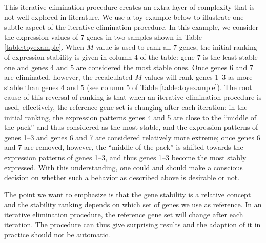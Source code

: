 		This iterative elimination procedure creates an extra layer of complexity that
		is not well explored in literature. We use a toy example below to illustrate
		one subtle aspect of the iterative elimination procedure.  In this example, we
		consider the expression values of 7 genes in two samples shown in Table
		\ref{table:toyexample}. When $M$-value is used to rank all $7$ genes, the
		initial ranking of expression stability is given in column 4 of the table:
		gene $7$ is the least stable one and genes $4$ and $5$ are considered the most
		stable ones.  Once genes 6 and 7 are eliminated, however, the recalculated
		$M$-values will rank genes 1--3 as more stable than genes $4$ and
		$5$ (see column 5 of Table \ref{table:toyexample}). The root cause of this
		reversal of ranking is that when an iterative elimination procedure is used,
		effectively, the reference gene set is changing after each iteration: in the
		initial ranking, the expression patterns genes 4 and 5 are close to the
		``middle of the pack'' and thus considered as the most stable, and the
		expression patterns of genes 1--3 and genes 6 and 7 are considered relatively
		more extreme; once genes 6 and 7 are removed, however, the ``middle of the
		pack'' is shifted towards the expression patterns of genes 1--3, and thus
		genes 1--3 become the most stably expressed.  With this understanding, one
		could and should make a conscious decision on whether such a behavior as
		described above is desirable or not.  
		
		The point we want to emphasize is that the gene stability is a relative concept
		and the stability ranking depends on which set of genes we use as reference.
		In an iterative elimination procedure, the reference gene set will change
		after each iteration. The procedure can thus give surprising results and the
		adaption of it in practice should not be automatic.
		
